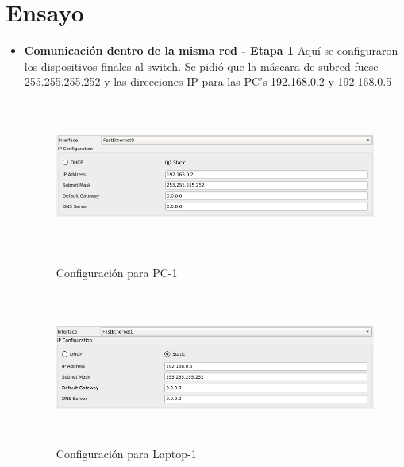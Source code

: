 \section*{Ensayo}

{
    \renewcommand{\labelitemi}{$\diamond$}
    \begin{itemize}
        \item \textbf{Comunicaci\'on dentro de la misma red - Etapa 1}
            \newline
            Aqu\'i se configuraron los dispositivos finales al switch. Se pidi\'o que la m\'ascara de subred
            fuese 255.255.255.252 y las direcciones IP para las PC's 192.168.0.2 y 192.168.0.5
            \begin{figure}[ht]
                \centering
                \includegraphics[width=12cm, height=5cm]{imagenes/captura1.png}
                \caption{Configuraci\'on para PC-1}
            
                \includegraphics[width=12cm, height=5cm]{imagenes/captura2.png}
                \caption{Configuraci\'on para Laptop-1}
                

\end{figure}
\end{itemize}}
